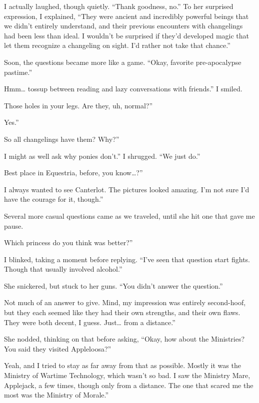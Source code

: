 I actually laughed, though quietly. “Thank goodness, no.” To her surprised expression, I explained, “They were ancient and incredibly powerful beings that we didn’t entirely understand, and their previous encounters with changelings had been less than ideal. I wouldn’t be surprised if they’d developed magic that let them recognize a changeling on sight. I’d rather not take that chance.”

Soon, the questions became more like a game. “Okay, favorite pre-apocalypse pastime.”

\leavevmode{}Hmm… tossup between reading and lazy conversations with friends.” I smiled.

\leavevmode{}Those holes in your legs. Are they, uh, normal?”

\leavevmode{}Yes.”

\leavevmode{}So all changelings have them? Why?”

\leavevmode{}I might as well ask why ponies don’t.” I shrugged. “We just do.”

\leavevmode{}Best place in Equestria, before, you know…?”

\leavevmode{}I always wanted to see Canterlot. The pictures looked amazing. I’m not sure I’d have the courage for it, though.”

Several more casual questions came as we traveled, until she hit one that gave me pause.

\leavevmode{}Which princess do you think was better?”

I blinked, taking a moment before replying. “I’ve seen that question start fights. Though that usually involved alcohol.”

She snickered, but stuck to her guns. “You didn’t answer the question.”

\leavevmode{}Not much of an answer to give. Mind, my impression was entirely second-hoof, but they each seemed like they had their own strengths, and their own flaws. They were both decent, I guess. Just… from a distance.”

She nodded, thinking on that before asking, “Okay, how about the Ministries? You said they visited Appleloosa?”

\leavevmode{}Yeah, and I tried to stay as far away from that as possible. Mostly it was the Ministry of Wartime Technology, which wasn’t so bad. I saw the Ministry Mare, Applejack, a few times, though only from a distance. The one that scared me the most was the Ministry of Morale.”

